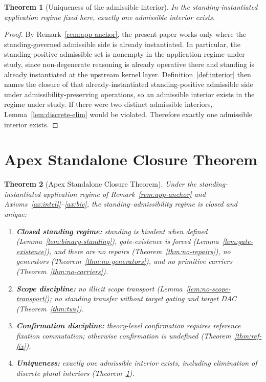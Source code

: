 \documentclass[12pt]{article}
\newtheorem{theorem}{Theorem}
\begin{document}
\begin{theorem}[Uniqueness of the admissible interior]
\label{thm:unique}
In the standing-instantiated application regime fixed here, exactly one admissible interior exists.
\end{theorem}

\begin{proof}
By Remark~\ref{rem:app-anchor}, the present paper works only where the standing-governed admissible side is already instantiated.
In particular, the standing-positive admissible set is nonempty in the application regime under study, since non-degenerate reasoning is already operative there and standing is already instantiated at the upstream kernel layer.
Definition~\ref{def:interior} then names the closure of that already-instantiated standing-positive admissible side under admissibility-preserving operations, so an admissible interior exists in the regime under study.
If there were two distinct admissible interiors, Lemma~\ref{lem:discrete-elim} would be violated.
Therefore exactly one admissible interior exists.
\end{proof}

\section{Apex Standalone Closure Theorem}
\label{sec:apex}

\begin{theorem}[Apex Standalone Closure Theorem]
\label{thm:apex}
Under the standing-instantiated application regime of Remark~\ref{rem:app-anchor} and Axioms~\ref{ax:intell}--\ref{ax:biv}, the standing--admissibility regime is closed and unique:
\begin{enumerate}[label=(\roman*), leftmargin=2.2em]
\item \textbf{Closed standing regime:} standing is bivalent when defined (Lemma~\ref{lem:binary-standing}), gate-existence is forced (Lemma~\ref{lem:gate-existence}),
and there are no repairs (Theorem~\ref{thm:no-repairs}), no generators (Theorem~\ref{thm:no-generators}), and no primitive carriers (Theorem~\ref{thm:no-carriers}).
\item \textbf{Scope discipline:} no illicit scope transport (Lemma~\ref{lem:no-scope-transport}); no standing transfer without target gating and target DAC (Theorem~\ref{thm:tws}).
\item \textbf{Confirmation discipline:} theory-level confirmation requires reference fixation commutation; otherwise confirmation is undefined (Theorem~\ref{thm:ref-fix}).
\item \textbf{Uniqueness:} exactly one admissible interior exists, including elimination of discrete plural interiors (Theorem~\ref{thm:unique}).
\end{enumerate}
\end{theorem}
\end{document}
